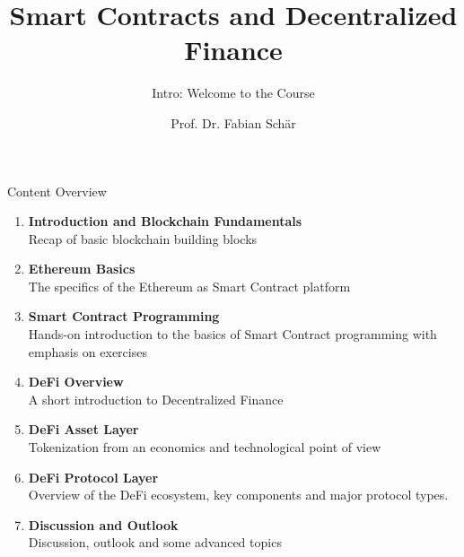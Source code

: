 \documentclass[handout]{beamer}
\title{Smart Contracts and Decentralized Finance}
\subtitle{Intro: Welcome to the Course}
\author{Prof. Dr. Fabian Schär}
\institute{University of Basel}
\begin{document}
\thispagestyle{empty}
\begin{frame}[noframenumbering]
	\titlepage
\end{frame}

\begin{frame}{Content Overview}
\small
\begin{enumerate}
	\item<1-> \textbf{Introduction and Blockchain Fundamentals}\\
		Recap of basic blockchain building blocks
		\vspace{0.2em}
	\item<2-> \textbf{Ethereum Basics}\\
		The specifics of the Ethereum as Smart Contract platform
		\vspace{0.2em}
	\item<3-> \textbf{Smart Contract Programming}\\
		Hands-on introduction to the basics of Smart Contract programming with emphasis on exercises
	\item<4-> \textbf{DeFi Overview}\\
		A short introduction to Decentralized Finance
		\vspace{0.2em}
	\item<5-> \textbf{DeFi Asset Layer}\\
		Tokenization from an economics and technological point of view
		\vspace{0.2em}
	\item<6-> \textbf{DeFi Protocol Layer}\\
			Overview of the DeFi ecosystem, key components and major protocol types.
	\item<7-> \textbf{Discussion and Outlook}\\
			Discussion, outlook and some advanced topics
\end{enumerate}

\end{frame}
\end{document}
